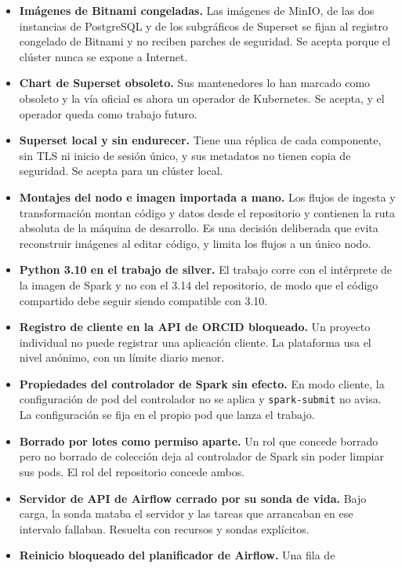 \begin{itemize}
  \item \textbf{Imágenes de Bitnami congeladas.} Las imágenes de MinIO, de
  las dos instancias de PostgreSQL y de los subgráficos de Superset se fijan
  al registro congelado de Bitnami y no reciben parches de seguridad. Se
  acepta porque el clúster nunca se expone a Internet.
  \item \textbf{Chart de Superset obsoleto.} Sus mantenedores lo han marcado
  como obsoleto y la vía oficial es ahora un operador de Kubernetes. Se
  acepta, y el operador queda como trabajo futuro.
  \item \textbf{Superset local y sin endurecer.} Tiene una réplica de cada
  componente, sin TLS ni inicio de sesión único, y sus metadatos no tienen
  copia de seguridad. Se acepta para un clúster local.
  \item \textbf{Montajes del nodo e imagen importada a mano.} Los flujos de
  ingesta y transformación montan código y datos desde el repositorio y
  contienen la ruta absoluta de la máquina de desarrollo. Es una decisión
  deliberada que evita reconstruir imágenes al editar código, y limita los
  flujos a un único nodo.
  \item \textbf{Python 3.10 en el trabajo de silver.} El trabajo corre con el
  intérprete de la imagen de Spark y no con el 3.14 del repositorio, de modo
  que el código compartido debe seguir siendo compatible con 3.10.
  \item \textbf{Registro de cliente en la API de ORCID bloqueado.} Un
  proyecto individual no puede registrar una aplicación cliente. La
  plataforma usa el nivel anónimo, con un límite diario menor.
  \item \textbf{Propiedades del controlador de Spark sin efecto.} En modo
  cliente, la configuración de pod del controlador no se aplica y
  \texttt{spark-submit} no avisa. La configuración se fija en el propio pod
  que lanza el trabajo.
  \item \textbf{Borrado por lotes como permiso aparte.} Un rol que concede
  borrado pero no borrado de colección deja al controlador de Spark sin poder
  limpiar sus pods. El rol del repositorio concede ambos.
  \item \textbf{Servidor de API de Airflow cerrado por su sonda de vida.}
  Bajo carga, la sonda mataba el servidor y las tareas que arrancaban en ese
  intervalo fallaban. Resuelta con recursos y sondas explícitos.
  \item \textbf{Reinicio bloqueado del planificador de Airflow.} Una fila de

\end{itemize}
